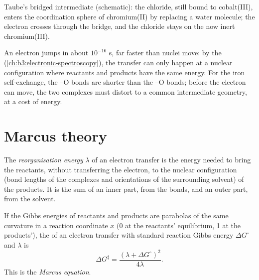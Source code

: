 \begin{omfigure}

{\small Taube's bridged intermediate (schematic): the chloride, still bound to
cobalt(III), enters the coordination sphere of chromium(II) by replacing a water
molecule; the electron crosses through the bridge, and the chloride stays on the
now inert chromium(III).}
\end{omfigure}

An electron jumps in about $10^{-16}$ s, far faster than nuclei move: by the
 (\cref{ch:b3:electronic-spectroscopy}), the transfer
can only happen at a nuclear configuration where reactants and products have
the same energy. For the iron self-exchange, the --O bonds are shorter than
the --O bonds; before the electron can move, the two complexes must distort to
a common intermediate geometry, at a cost of energy.

\section{Marcus theory}

\begin{definition}\label{def:b3:complex-mechanisms:reorganisation}
The \emph{reorganisation energy} $\lambda$ of an
electron transfer is the energy needed to bring the reactants, without
transferring the electron, to the nuclear configuration (bond lengths of the
complexes and orientations of the surrounding solvent) of the products. It is the
sum of an inner part, from the bonds, and an outer part, from the solvent.
\end{definition}

\begin{theorem}\label{thm:b3:complex-mechanisms:marcus}
If the Gibbs energies of reactants and products are parabolas of the same
curvature in a reaction coordinate $x$ (0 at the reactants' equilibrium, 1 at the
products'), the  of an electron transfer with
standard reaction Gibbs energy $\Delta G^\circ$ and  $\lambda$ is
\[
  \Delta G^{\ddagger} = \frac{(\lambda + \Delta G^\circ)^2}{4\lambda} .
\]
This is the \emph{Marcus equation}.
\end{theorem}


